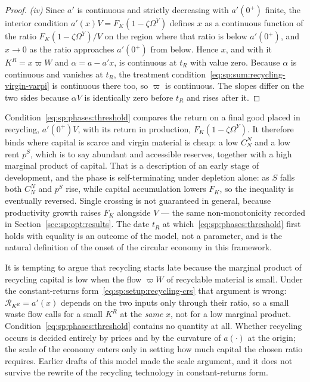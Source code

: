 \begin{proof}
\emph{(iv)} Since $a'$ is continuous and strictly decreasing with $a'\left(0^+\right)$ finite, the
interior condition $a'\left(x\right)V=F_K\left(1-\zeta\Omega^Y\right)$ defines $x$ as a continuous
function of the ratio $F_K\left(1-\zeta\Omega^Y\right)/V$ on the region where that ratio is below
$a'\left(0^+\right)$, and $x\to0$ as the ratio approaches $a'\left(0^+\right)$ from below. Hence $x$,
and with it $K^R=x\varpi W$ and $\alpha=a-a'x$, is continuous at $t_R$ with value zero. Because
$\alpha$ is continuous and vanishes at $t_R$, the treatment
condition~\eqref{eq:sp:sum:recycling-virgin-varpi} is continuous there too, so $\varpi$ is continuous. The
slopes differ on the two sides because $\alpha V$ is identically zero before $t_R$ and rises after it.
\end{proof}

 Condition~\eqref{eq:sp:phases:threshold} compares the return on
a final good placed in recycling, $a'\left(0^+\right)V$, with its return in production,
$F_K\left(1-\zeta\Omega^Y\right)$. It therefore binds where capital is scarce and virgin material is
cheap: a low $C^N_N$ and a low rent $p^S$, which is to say abundant and accessible reserves, together
with a high marginal product of capital. That is a description of an early stage of development, and
the phase is self-terminating under depletion alone: as $S$ falls both $C^N_N$ and $p^S$ rise, while
capital accumulation lowers $F_K$, so the inequality is eventually reversed. Single crossing is not
guaranteed in general, because productivity growth raises $F_K$ alongside $V$ --- the same
non-monotonicity recorded in Section~\ref{sec:sp:opt:results}. The date $t_R$ at
which~\eqref{eq:sp:phases:threshold} first holds with equality is an outcome of the model, not a
parameter, and is the natural definition of the onset of the circular economy in this framework.

\begin{remark}\label{rem:sp:scalefree}
It is tempting to argue that recycling starts late because the marginal product of recycling capital
is low when the flow $\varpi W$ of recyclable material is small. Under the constant-returns
form~\eqref{eq:sp:setup:recycling-crs} that argument is wrong: $\mathcal R_{K^R}=a'\left(x\right)$
depends on the two inputs only through their ratio, so a small waste flow calls for a small $K^R$ at
the \emph{same} $x$, not for a low marginal product. Condition~\eqref{eq:sp:phases:threshold} contains
no quantity at all. Whether recycling occurs is decided entirely by prices and by the curvature of
$a\left(\cdot\right)$ at the origin; the scale of the economy enters only in setting how much capital
the chosen ratio requires. Earlier drafts of this model made the scale argument, and it does not
survive the rewrite of the recycling technology in constant-returns form.
\end{remark}


